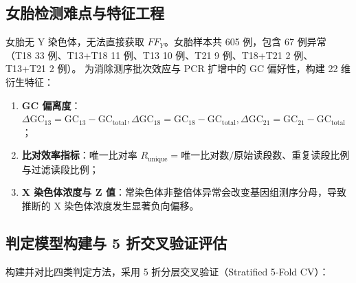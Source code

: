 \documentclass[11pt,a4paper]{article}
\begin{document}
\subsection{女胎检测难点与特征工程}
女胎无 Y 染色体，无法直接获取 $FF_Y$。女胎样本共 605 例，包含 67 例异常（T18 33 例、T13+T18 11 例、T13 10 例、T21 9 例、T18+T21 2 例、T13+T21 2 例）。
为消除测序批次效应与 PCR 扩增中的 GC 偏好性，构建 22 维衍生特征：
\begin{enumerate}[leftmargin=*]
    \item \textbf{GC 偏离度}：$\Delta\text{GC}_{13} = \text{GC}_{13} - \text{GC}_{\text{total}}, \Delta\text{GC}_{18} = \text{GC}_{18} - \text{GC}_{\text{total}}, \Delta\text{GC}_{21} = \text{GC}_{21} - \text{GC}_{\text{total}}$；
    \item \textbf{比对效率指标}：唯一比对率 $R_{\text{unique}} = \text{唯一比对数}/\text{原始读段数}$、重复读段比例与过滤读段比例；
    \item \textbf{X 染色体浓度与 Z 值}：常染色体非整倍体异常会改变基因组测序分母，导致推断的 X 染色体浓度发生显著负向偏移。
\end{enumerate}

\subsection{判定模型构建与 5 折交叉验证评估}
构建并对比四类判定方法，采用 5 折分层交叉验证（Stratified 5-Fold CV）：

\begin{table}[H]
\centering
\small
\caption{女胎染色体非整倍体异常判定模型 5 折交叉验证性能评估}
\end{table}
\end{document}
